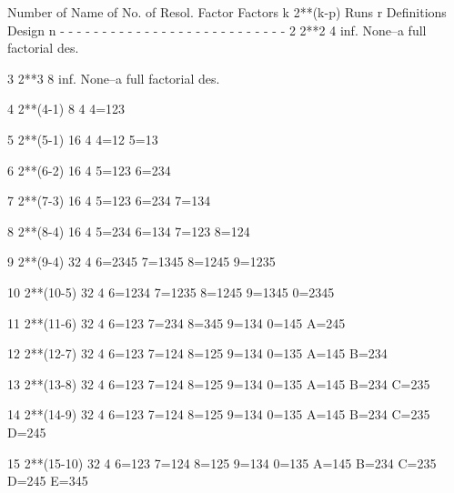    Number of  Name of    No. of Resol.  Factor
   Factors k  2**(k-p)    Runs    r     Definitions
               Design      n
   - - - - - - - - - - - - - - - - - - - - - - - - - - -
       2      2**2         4     inf.   None--a full
                                        factorial des.
 
       3      2**3         8     inf.   None--a full
                                        factorial des.
 
       4      2**(4-1)     8      4     4=123
 
       5      2**(5-1)    16      4     4=12 5=13
 
       6      2**(6-2)    16      4     5=123 6=234
 
       7      2**(7-3)    16      4     5=123 6=234
                                        7=134
 
       8      2**(8-4)    16      4     5=234 6=134
                                        7=123 8=124
 
       9      2**(9-4)    32      4     6=2345 7=1345
                                        8=1245 9=1235
 
      10      2**(10-5)   32      4     6=1234 7=1235
                                        8=1245 9=1345
                                        0=2345
 
      11      2**(11-6)   32      4     6=123 7=234
                                        8=345 9=134
                                        0=145 A=245
 
      12      2**(12-7)   32      4     6=123 7=124
                                        8=125 9=134
                                        0=135 A=145
                                        B=234
 
      13      2**(13-8)   32      4     6=123 7=124
                                        8=125 9=134
                                        0=135 A=145
                                        B=234 C=235
 
      14      2**(14-9)   32      4     6=123 7=124
                                        8=125 9=134
                                        0=135 A=145
                                        B=234 C=235
                                        D=245
 
      15      2**(15-10)  32      4     6=123 7=124
                                        8=125 9=134
                                        0=135 A=145
                                        B=234 C=235
                                        D=245 E=345
 
